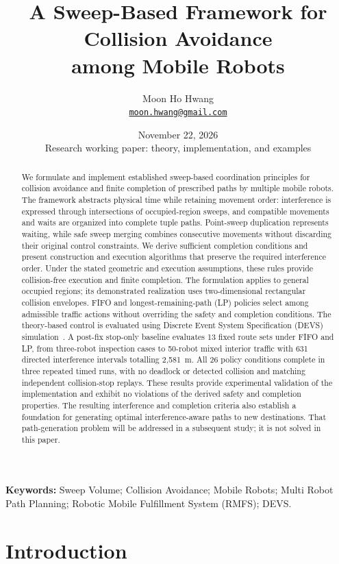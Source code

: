 \documentclass[11pt,a4paper]{article}
\title{A Sweep-Based Framework for Collision Avoidance\\among Mobile Robots}
\author{Moon Ho Hwang\\\small\href{mailto:moon.hwang@gmail.com}{\texttt{moon.hwang@gmail.com}}}
\date{November 22, 2026\\\small Research working paper: theory, implementation, and examples}
\theoremstyle{remark}
\newcounter{algorithm}
\begin{document}
\maketitle
\begin{abstract}
We formulate and implement established sweep-based coordination principles for collision avoidance and finite
completion of prescribed paths by multiple mobile robots. The framework
abstracts physical time while retaining movement order: interference is
expressed through intersections of occupied-region sweeps, and compatible
movements and waits are organized into complete tuple paths. Point-sweep
duplication represents waiting, while safe sweep merging combines consecutive
movements without discarding their original control constraints. We derive
sufficient completion conditions and present construction and execution
algorithms that preserve the required interference order. Under the stated
geometric and execution assumptions, these rules provide collision-free
execution and finite completion. The formulation applies to general
occupied regions; its demonstrated realization uses two-dimensional
rectangular collision envelopes. FIFO and longest-remaining-path (LP)
policies select among admissible traffic actions without overriding the
safety and completion conditions. The theory-based control is evaluated
using Discrete Event System Specification (DEVS)
simulation~\cite{zeigler1976,zeigler2018}. A post-fix stop-only baseline
evaluates 13 fixed route sets under FIFO and LP, from three-robot inspection
cases to 50-robot mixed interior traffic with 631 directed
interference intervals totalling 2,581~m. All 26 policy conditions complete
in three repeated timed runs, with no deadlock or detected collision and matching independent
collision-stop replays. These results provide experimental validation of
the implementation and exhibit no violations of the derived safety and
completion properties. The resulting interference and completion criteria
also establish a foundation for generating optimal interference-aware
paths to new destinations. That path-generation problem will be addressed
in a subsequent study; it is not solved in this paper.
\end{abstract}

\noindent\textbf{Keywords:} Sweep Volume;  Collision 
Avoidance; Mobile Robots; Multi Robot Path Planning;
Robotic Mobile Fulfillment System (RMFS); DEVS.

\section{Introduction}
\end{document}
